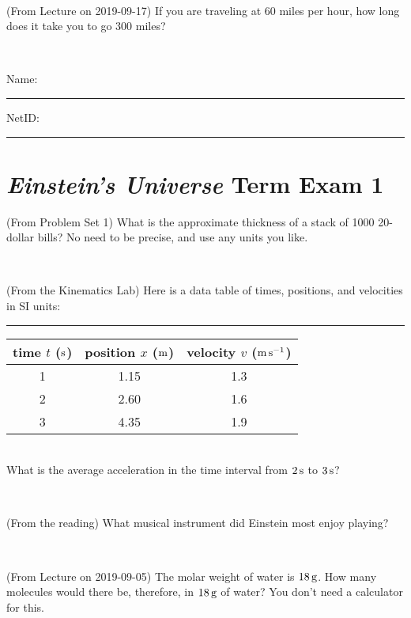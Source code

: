 \documentclass[12pt, letterpaper]{article}
\begin{document}
\vfill ~

\begin{problem} (From Lecture on 2019-09-17)
If you are traveling at 60 miles per hour, how long does
it take you to go 300 miles?
\end{problem}


\vfill ~


\cleardoublepage



\noindent
Name: \rule[-1ex]{0.60\textwidth}{0.1pt}
NetID: \rule[-1ex]{0.20\textwidth}{0.1pt}

\section*{\textsl{Einstein's Universe} Term Exam 1}
\setcounter{problem}{1}


\begin{problem} (From Problem Set 1)
What is the approximate thickness of a stack of 1000 20-dollar bills?
No need to be precise, and use any units you like.
\end{problem}


\vfill ~

\begin{problem} (From the Kinematics Lab)
Here is a data table of times, positions, and velocities in SI units:\\
\rule{1.0in}{0pt}\begin{tabular}{c|c|c}
time $t$ ($\mathrm{s}$) & position $x$ ($\mathrm{m}$) & velocity $v$ ($\mathrm{m}\,\mathrm{s}^{-1}$) \\
\hline
1 & 1.15 & 1.3 \\
2 & 2.60 & 1.6 \\
3 & 4.35 & 1.9 \\
\hline
\end{tabular}\\
What is the average acceleration in the time interval from $2\,\mathrm{s}$ to $3\,\mathrm{s}$?
\end{problem}


\vfill ~

\begin{problem} (From the reading)
What musical instrument did Einstein most enjoy playing?
\end{problem}


\vfill ~

\begin{problem} (From Lecture on 2019-09-05)
The molar weight of water is $18\,\mathrm{g}$. How many molecules would there
be, therefore, in $18\,\mathrm{g}$ of water? You don't need a calculator for
this.
\end{problem}
\end{document}
